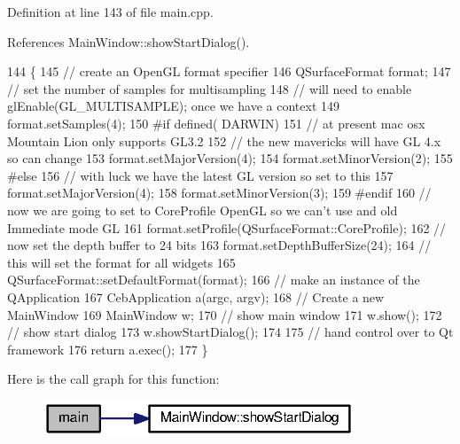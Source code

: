 Definition at line 143 of file main.\-cpp.



References Main\-Window\-::show\-Start\-Dialog().


\begin{DoxyCode}
144 \{
145   \textcolor{comment}{// create an OpenGL format specifier}
146   QSurfaceFormat format;
147   \textcolor{comment}{// set the number of samples for multisampling}
148   \textcolor{comment}{// will need to enable glEnable(GL\_MULTISAMPLE); once we have a context}
149   format.setSamples(4);
150 \textcolor{preprocessor}{  #if defined( DARWIN)}
151 \textcolor{preprocessor}{}    \textcolor{comment}{// at present mac osx Mountain Lion only supports GL3.2}
152     \textcolor{comment}{// the new mavericks will have GL 4.x so can change}
153     format.setMajorVersion(4);
154     format.setMinorVersion(2);
155 \textcolor{preprocessor}{  #else}
156 \textcolor{preprocessor}{}    \textcolor{comment}{// with luck we have the latest GL version so set to this}
157     format.setMajorVersion(4);
158     format.setMinorVersion(3);
159 \textcolor{preprocessor}{  #endif}
160 \textcolor{preprocessor}{}  \textcolor{comment}{// now we are going to set to CoreProfile OpenGL so we can't use and old Immediate mode GL}
161   format.setProfile(QSurfaceFormat::CoreProfile);
162   \textcolor{comment}{// now set the depth buffer to 24 bits}
163   format.setDepthBufferSize(24);
164   \textcolor{comment}{// this will set the format for all widgets}
165   QSurfaceFormat::setDefaultFormat(format);
166   \textcolor{comment}{// make an instance of the QApplication}
167   CebApplication a(argc, argv);
168   \textcolor{comment}{// Create a new MainWindow}
169   MainWindow w;
170   \textcolor{comment}{// show main window}
171   w.show();
172   \textcolor{comment}{// show start dialog}
173   w.showStartDialog();
174 
175   \textcolor{comment}{// hand control over to Qt framework}
176   \textcolor{keywordflow}{return} a.exec();
177 \}
\end{DoxyCode}


Here is the call graph for this function\-:\nopagebreak
\begin{figure}[H]
\begin{center}
\leavevmode
\includegraphics[width=264pt]{main_8cpp_a3c04138a5bfe5d72780bb7e82a18e627_cgraph}
\end{center}
\end{figure}


